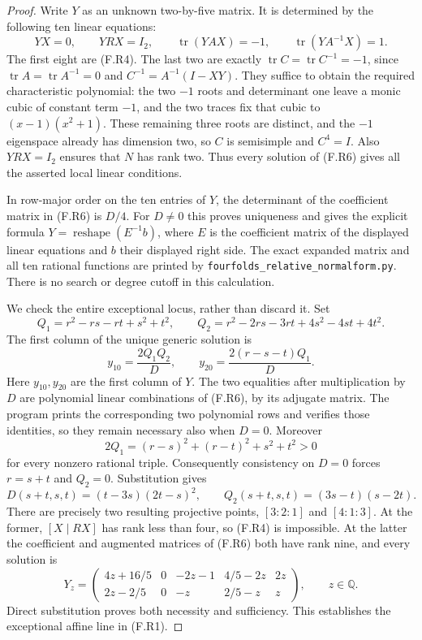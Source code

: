\begin{proof}
Write $Y$ as an unknown two-by-five matrix.  It is determined
by the following ten linear equations:
\[
 YX=0,\qquad YRX=I_2,\qquad
 \operatorname{tr}(YAX)=-1,\qquad
 \operatorname{tr}(YA^{-1}X)=1.
 \tag{F.R6}
\]
The first eight are (F.R4).  The last two are exactly
$\operatorname{tr}C=\operatorname{tr}C^{-1}=-1$, since
$\operatorname{tr}A=\operatorname{tr}A^{-1}=0$ and
$C^{-1}=A^{-1}(I-XY)$.
They suffice to obtain the required characteristic
polynomial: the two $-1$ roots and determinant one leave a
monic cubic of constant term $-1$, and the two traces fix
that cubic to $(x-1)(x^2+1)$.
These remaining three roots are distinct, and the $-1$
eigenspace already has dimension two, so $C$ is semisimple
and $C^4=I$.  Also $YRX=I_2$ ensures that $N$ has rank two.
Thus every solution of (F.R6) gives all the asserted local
linear conditions.

In row-major order on the ten entries of $Y$, the determinant
of the coefficient matrix in (F.R6) is $D/4$.
For $D\ne0$ this proves uniqueness and gives the explicit
formula $Y=\operatorname{reshape}(E^{-1}b)$, where $E$ is
the coefficient matrix of the displayed linear equations
and $b$ their displayed right side.
The exact expanded matrix and all ten rational functions
are printed by \texttt{fourfolds\_relative\_normalform.py}.
There is no search or degree cutoff in this calculation.

We check the entire exceptional locus, rather than discard it.
Set
\[
 Q_1=r^2-rs-rt+s^2+t^2,
 \qquad Q_2=r^2-2rs-3rt+4s^2-4st+4t^2.
\]
The first column of the unique generic solution is
\[
 y_{10}=\frac{2Q_1Q_2}{D},\qquad
 y_{20}=\frac{2(r-s-t)Q_1}{D}.
 \tag{F.R7}
\]
Here $y_{10},y_{20}$ are the first column of $Y$.
The two equalities after multiplication by $D$ are polynomial
linear combinations of (F.R6), by its adjugate matrix.
The program prints the corresponding two polynomial rows
and verifies those identities, so they remain necessary
also when $D=0$.
Moreover
\[
 2Q_1=(r-s)^2+(r-t)^2+s^2+t^2>0
\]
for every nonzero rational triple.  Consequently consistency
on $D=0$ forces $r=s+t$ and $Q_2=0$.
Substitution gives
\[
 D(s+t,s,t)=(t-3s)(2t-s)^2,
 \qquad Q_2(s+t,s,t)=(3s-t)(s-2t).
 \tag{F.R8}
\]
There are precisely two resulting projective points,
$[3:2:1]$ and $[4:1:3]$.
At the former, $[X\mid RX]$ has rank less than four, so
(F.R4) is impossible.  At the latter the coefficient and
augmented matrices of (F.R6) both have rank nine, and every
solution is
\[
 Y_z=\begin{pmatrix}
 4z+16/5&0&-2z-1&4/5-2z&2z\\
 2z-2/5&0&-z&2/5-z&z
 \end{pmatrix},\qquad z\in\mathbb Q.
 \tag{F.R9}
\]
Direct substitution proves both necessity and sufficiency.
This establishes the exceptional affine line in (F.R1).


\end{proof}
